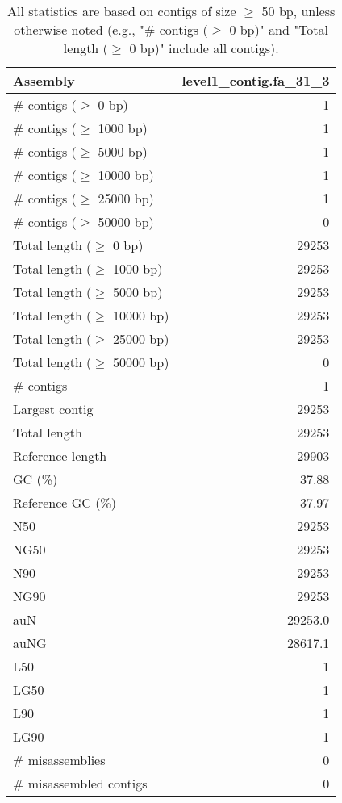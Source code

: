 \documentclass[12pt,a4paper]{article}
\begin{document}
\begin{table}[ht]
\begin{center}
\caption{All statistics are based on contigs of size $\geq$ 50 bp, unless otherwise noted (e.g., "\# contigs ($\geq$ 0 bp)" and "Total length ($\geq$ 0 bp)" include all contigs).}
\begin{tabular}{|l*{1}{|r}|}
\hline
Assembly & level1\_contig.fa\_31\_3 \\ \hline
\# contigs ($\geq$ 0 bp) & 1 \\ \hline
\# contigs ($\geq$ 1000 bp) & 1 \\ \hline
\# contigs ($\geq$ 5000 bp) & 1 \\ \hline
\# contigs ($\geq$ 10000 bp) & 1 \\ \hline
\# contigs ($\geq$ 25000 bp) & 1 \\ \hline
\# contigs ($\geq$ 50000 bp) & 0 \\ \hline
Total length ($\geq$ 0 bp) & 29253 \\ \hline
Total length ($\geq$ 1000 bp) & 29253 \\ \hline
Total length ($\geq$ 5000 bp) & 29253 \\ \hline
Total length ($\geq$ 10000 bp) & 29253 \\ \hline
Total length ($\geq$ 25000 bp) & 29253 \\ \hline
Total length ($\geq$ 50000 bp) & 0 \\ \hline
\# contigs & 1 \\ \hline
Largest contig & 29253 \\ \hline
Total length & 29253 \\ \hline
Reference length & 29903 \\ \hline
GC (\%) & 37.88 \\ \hline
Reference GC (\%) & 37.97 \\ \hline
N50 & 29253 \\ \hline
NG50 & 29253 \\ \hline
N90 & 29253 \\ \hline
NG90 & 29253 \\ \hline
auN & 29253.0 \\ \hline
auNG & 28617.1 \\ \hline
L50 & 1 \\ \hline
LG50 & 1 \\ \hline
L90 & 1 \\ \hline
LG90 & 1 \\ \hline
\# misassemblies & 0 \\ \hline
\# misassembled contigs & 0 \\ \hline

\end{tabular}
\end{center}
\end{table}
\end{document}
